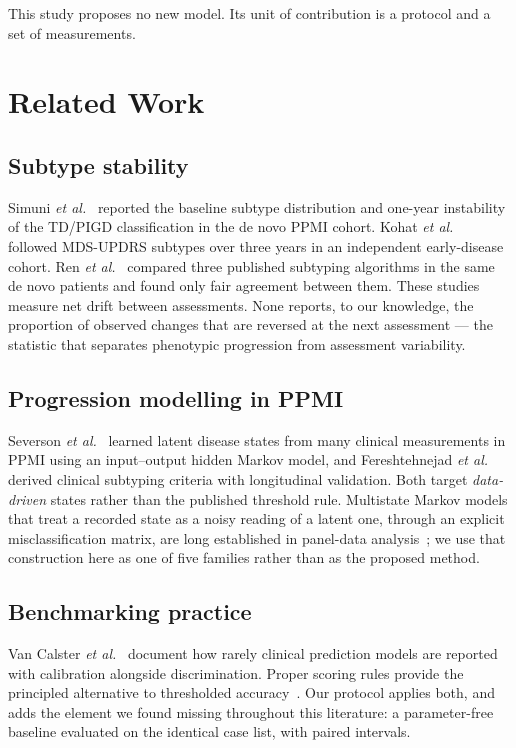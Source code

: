\documentclass[journal]{IEEEtran}
\begin{document}
This study proposes no new model. Its unit of contribution is a protocol and a
set of measurements.

\section{Related Work}

\subsection{Subtype stability}
Simuni \textit{et al.}~\cite{simuni2016} reported the baseline subtype
distribution and one-year instability of the TD/PIGD classification in the de
novo PPMI cohort. Kohat \textit{et al.}~\cite{kohat2021} followed MDS-UPDRS
subtypes over three years in an independent early-disease cohort. Ren
\textit{et al.}~\cite{ren2020,ren2021} compared three published subtyping
algorithms in the same de novo patients and found only fair agreement between
them. These studies measure net drift between assessments. None reports, to our
knowledge, the proportion of observed changes that are reversed at the next
assessment --- the statistic that separates phenotypic progression from
assessment variability.

\subsection{Progression modelling in PPMI}
Severson \textit{et al.}~\cite{severson2021} learned latent disease states from
many clinical measurements in PPMI using an input--output hidden Markov model,
and Fereshtehnejad \textit{et al.}~\cite{fereshtehnejad2017} derived clinical
subtyping criteria with longitudinal validation. Both target \emph{data-driven}
states rather than the published threshold rule. Multistate Markov models that
treat a recorded state as a noisy reading of a latent one, through an explicit
misclassification matrix, are long established in panel-data
analysis~\cite{jackson2011}; we use that construction here as one of five
families rather than as the proposed method.

\subsection{Benchmarking practice}
Van Calster \textit{et al.}~\cite{vancalster2019} document how rarely clinical
prediction models are reported with calibration alongside discrimination. Proper
scoring rules provide the principled alternative to thresholded
accuracy~\cite{gneiting2007}. Our protocol applies both, and adds the element we
found missing throughout this literature: a parameter-free baseline evaluated on
the identical case list, with paired intervals.
\end{document}
